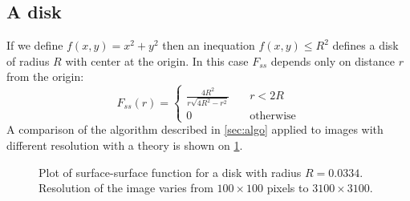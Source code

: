 \documentclass[reprint,amsmath,amssymb,aps,pre,showkeys,showpacs]{revtex4-1}
\begin{document}
\subsection{A disk}
If we define $f(x, y) = x^2 + y^2$ then an inequation $f(x, y) \le R^2$ defines
a disk of radius $R$ with center at the origin. In this case $F_{ss}$ depends
only on distance $r$ from the origin:
\begin{equation*}
  F_{ss}(r) = \left\{
  \begin{array}{ll}
    \frac{4R^2}{r\sqrt{4R^2-r^2}} & \quad r < 2R \\
    0 & \quad \text{otherwise}
  \end{array}
  \right.
\end{equation*}
A comparison of the algorithm described in \cref{sec:algo} applied to images
with different resolution with a theory is shown on \cref{fig:fss-disk}.
\begin{figure}[!pt]
  \centering
  \hfill
  \caption[]{Plot of surface-surface function for a disk with radius
    $R = 0.0334$. Resolution of the image varies from $100\times 100$ pixels to
    $3100\times 3100$.}
  \label{fig:fss-disk}
\end{figure}
\end{document}
